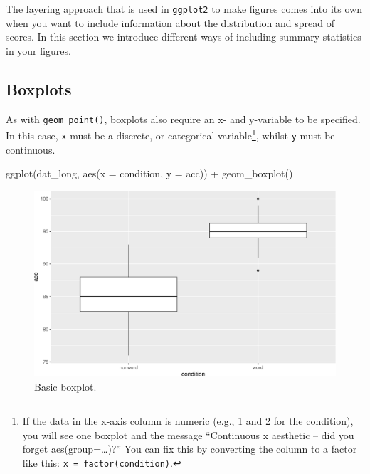 \documentclass[
  english,
  doc,floatsintext]{apa6}
\newenvironment{Shaded}{\begin{snugshade}}{\end{snugshade}}
\newcommand{\AttributeTok}[1]{\textcolor[rgb]{0.77,0.63,0.00}{#1}}
\newcommand{\FunctionTok}[1]{\textcolor[rgb]{0.00,0.00,0.00}{#1}}
\newcommand{\NormalTok}[1]{#1}
\newcommand{\SpecialCharTok}[1]{\textcolor[rgb]{0.00,0.00,0.00}{#1}}
\begin{document}
The layering approach that is used in \texttt{ggplot2} to make figures comes into its own when you want to include information about the distribution and spread of scores. In this section we introduce different ways of including summary statistics in your figures.

\hypertarget{boxplots}{%
\subsection{Boxplots}\label{boxplots}}

As with \texttt{geom\_point()}, boxplots also require an x- and y-variable to be specified. In this case, \texttt{x} must be a discrete, or categorical variable\footnote{If the data in the x-axis column is numeric (e.g., 1 and 2 for the condition), you will see one boxplot and the message ``Continuous x aesthetic -- did you forget aes(group=\ldots)?'' You can fix this by converting the column to a factor like this: \texttt{x\ =\ factor(condition)}.}, whilst \texttt{y} must be continuous.

\begin{Shaded}
\begin{Highlighting}[]
\FunctionTok{ggplot}\NormalTok{(dat\_long, }\FunctionTok{aes}\NormalTok{(}\AttributeTok{x =}\NormalTok{ condition, }\AttributeTok{y =}\NormalTok{ acc)) }\SpecialCharTok{+}
  \FunctionTok{geom\_boxplot}\NormalTok{()}
\end{Highlighting}
\end{Shaded}

\begin{figure}

{\centering \includegraphics[width=1\linewidth]{images/boxplot1-1} 

}

\caption{Basic boxplot.}\label{fig:boxplot1}
\end{figure}
\end{document}
